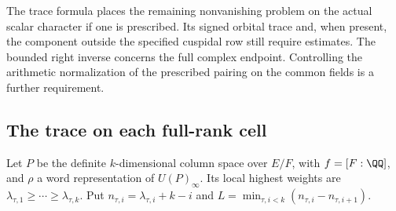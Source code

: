 \documentclass[a4paper,11pt]{article}
\theoremstyle{definition}
\theoremstyle{remark}
\numberwithin{equation}{section}
\begin{document}
The trace formula places the remaining nonvanishing problem on
the actual scalar character if one is prescribed. Its signed
orbital trace and, when present, the component outside the
specified cuspidal row still require estimates. The bounded
right inverse concerns the full complex endpoint. Controlling
the arithmetic normalization of the prescribed pairing on the
common fields is a further requirement.

\subsection{The trace on each full-rank cell}\label{nav:VII-33}
Let \(P\) be the definite \(k\)-dimensional column space over
\(E/F\), with \(f=[F:\QQ]\), and \(\rho\) a word representation
of \(U(P)_\infty\). Its local highest weights are
\(\lambda_{\tau,1}\ge\cdots\ge\lambda_{\tau,k}\). Put
\(n_{\tau,i}=\lambda_{\tau,i}+k-i\) and
\(L=\min_{\tau,i<k}(n_{\tau,i}-n_{\tau,i+1})\).
\end{document}
